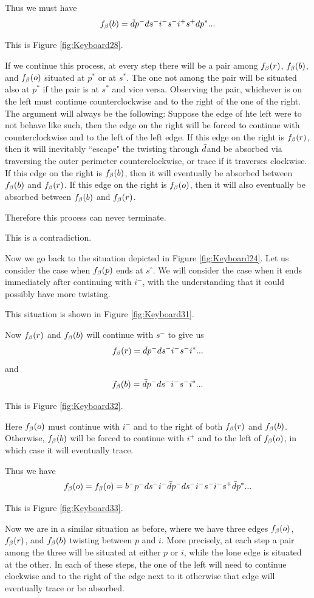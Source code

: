 Thus we must have
\[
f_\beta(b) = \bar{d} p^- d s^- i^- s^- i^+ s^+ d p^*...
\]

This is Figure \ref{fig:Keyboard28}.


If we continue this process, at every step there will be a pair among $f_\beta(r)$, $f_\beta(b)$, and $f_\beta(o)$ situated at $p^*$ or at $s^*$. The one not among the pair will be situated also at $p^*$ if the pair is at $s^*$ and vice versa. Observing the pair, whichever is on the left must continue counterclockwise and to the right of the one of the right. The argument will always be the following: Suppose the edge of hte left were to not behave like such, then the edge on the right will be forced to continue with counterclockwise and to the left of the left edge. If this edge on the right is $f_\beta(r)$, then it will inevitably ``escape" the twisting through $\bar{d} $and be absorbed via traversing the outer perimeter counterclockwise, or trace if it traverses clockwise. If this edge on the right is $f_\beta(b)$, then it will eventually be absorbed between $f_\beta(b)$ and $f_\beta(r)$. If this edge on the right is $f_\beta(o)$, then it will also eventually be absorbed between $f_\beta(b)$ and $f_\beta(r)$.

Therefore this process can never terminate.

This is a contradiction.

Now we go back to the situation depicted in Figure \ref{fig:Keyboard24}. Let us consider the case when $f_\beta(p)$ ends at $s^\circ$. We will consider the case when it ends immediately after continuing with $i^-$, with the understanding that it could possibly have more twisting.

This situation is shown in Figure \ref{fig:Keyboard31}.

Now $f_\beta(r)$ and $f_\beta(b)$ will continue with $s^-$ to give us
\[
f_\beta(r) = \bar{d} p^- d s^- i^- s^- i^*...
\]
and
\[
f_\beta(b) = \bar{d} p^- d s^- i^- s^- i^*...
\]


This is Figure \ref{fig:Keyboard32}.

Here $f_\beta(o)$ must continue with $i^-$ and to the right of both $f_\beta(r)$ and $f_\beta(b)$. Otherwise, $f_\beta(b)$ will be forced to continue with $i^+$ and to the left of $f_\beta(o)$, in which case it will eventually trace.

Thus we have
\[
f_\beta(o) = f_\beta(o) = b^- p^- d s^- i^- \bar{d} p^- d s^- i^- s^- i^- s^+ \bar{d} p^*...
\]

This is Figure \ref{fig:Keyboard33}.

Now we are in a similar situation as before, where we have three edges $f_\beta(o)$, $f_\beta(r)$, and $f_\beta(b)$ twisting between $p$ and $i$. More precisely, at each step a pair among the three will be situated at either $p$ or $i$, while the lone edge is situated at the other. In each of these steps, the one of the left will need to continue clockwise and to the right of the edge next to it otherwise that edge will eventually trace or be absorbed.

